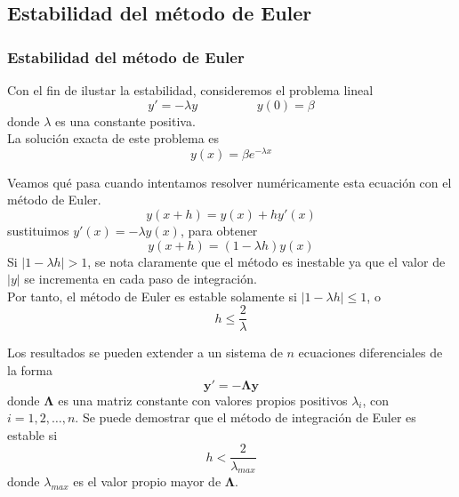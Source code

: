 \subsection{Estabilidad del método de Euler}
\begin{frame}
\frametitle{Estabilidad del método de Euler}
Con el fin de ilustar la estabilidad, consideremos el problema lineal
\[y' = - \lambda y \hspace{2cm} y(0) = \beta \]
donde $\lambda$ es una constante positiva.
\\
\medskip
La solución exacta de este problema es
\[ y(x) = \beta e^{- \lambda x} \] 
\end{frame}
\begin{frame}
Veamos qué pasa cuando intentamos resolver numéricamente esta ecuación con el método de Euler.
\[ y(x+h) = y(x) + h y'(x) \]
sustituimos $y'(x) = - \lambda y(x)$, para obtener
\[ y(x+h) = (1-\lambda h) y(x) \]
Si $\vert 1- \lambda h \vert > 1$, se nota claramente que el método es inestable ya que el valor de $\vert y \vert$ se incrementa en cada paso de integración.
\\
\medskip
Por tanto, el método de Euler es estable solamente si $\vert 1- \lambda h \vert \leq 1$, o
\[ h \leq \dfrac{2}{\lambda}\]
\end{frame}
\begin{frame}
Los resultados se pueden extender a un sistema de $n$ ecuaciones diferenciales de la forma
\[ \mathbf{y}' = - \mathbf{\Lambda y}\]
donde $\mathbf{\Lambda}$ es una matriz constante con valores propios positivos $\lambda_{i}$, con $i=1,2,\ldots,n$. Se puede demostrar que el método de integración de Euler es estable si
\[ h < \dfrac{2}{\lambda_{max}}\]
donde $\lambda_{max}$ es el valor propio mayor de $\mathbf{\Lambda}$.
\end{frame}
